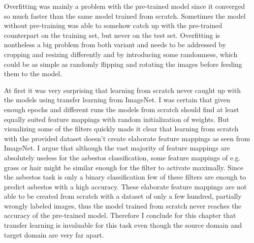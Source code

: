 \quad

Overfitting was mainly a problem with the pre-trained model since it converged so much faster than the same model trained from scratch. Sometimes the model without pre-training was able to somehow catch up with the pre-trained counterpart on the training set, but never on the test set. Overfitting is nontheless a big problem from both variant and needs to be addressed by cropping and resizing differently and by introducing some randomness, which could be as simple as randomly flipping and rotating the images before feeding them to the model.

At first it was very surprising that learning from scratch never caught up with the models using transfer learning from ImageNet. I was certain that given enough epochs and different runs the models from scratch should find at least equally suited feature mappings with random initialization of weights. But visualizing  some of the filters quickly made it clear that learning from scratch  with the provided dataset doesn't create elaborate feature mappings as seen from ImageNet. I argue that although the vast majority of feature mappings are absolutely useless for the asbestos classification, some feature mappings of e.g. grass or hair might be similar enough for the filter to activate maximally. Since the asbestos task is only a binary classification few of these filters are enough to predict asbestos with a high accuracy. These elaborate feature mappings are not able to be created from scratch with a dataset of only a few hundred, partially wrongly labeled images, thus the model trained from scratch never reaches the accuracy of the pre-trained model. Therefore I conclude for this chapter that transfer learning is invaluable for this task even though the source domain and target domain are very far apart.

